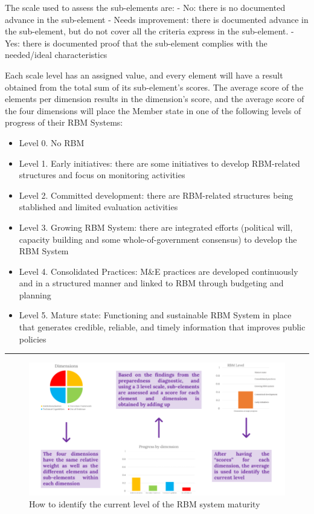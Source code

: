 \documentclass[
  10pt,
]{book}
\providecommand{\tightlist}{%
  \setlength{\itemsep}{0pt}\setlength{\parskip}{0pt}}
\begin{document}
The scale used to assess the sub-elements are:
- No: there is no documented advance in the sub-element
- Needs improvement: there is documented advance in the sub-element, but do not cover all the criteria express in the sub-element.
- Yes: there is documented proof that the sub-element complies with the needed/ideal characteristics

Each scale level has an assigned value, and every element will have a result obtained from the total sum of its sub-element's scores. The average score of the elements per dimension results in the dimension's score, and the average score of the four dimensions will place the Member state in one of the following levels of progress of their RBM Systems:

\begin{itemize}
\tightlist
\item
  Level 0. No RBM
\item
  Level 1. Early initiatives: there are some initiatives to develop RBM-related structures and focus on monitoring activities
\item
  Level 2. Committed development: there are RBM-related structures being stablished and limited evaluation activities
\item
  Level 3. Growing RBM System: there are integrated efforts (political will, capacity building and some whole-of-government consensus) to develop the RBM System
\item
  Level 4. Consolidated Practices: M\&E practices are developed continuously and in a structured manner and linked to RBM through budgeting and planning
\item
  Level 5. Mature state: Functioning and sustainable RBM System in place that generates credible, reliable, and timely information that improves public policies
\end{itemize}

\begin{center}\rule{0.5\linewidth}{0.5pt}\end{center}

\begin{figure}

{\centering \includegraphics[width=1\linewidth]{./images/figure_8} 

}

\caption{How to identify the current level of the RBM system maturity}\label{fig:figure8}
\end{figure}
\end{document}
